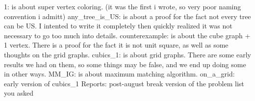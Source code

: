 1:                  is about super vertex coloring. (it was the first i wrote, so very poor naming convention i admitt)
any_tree_is_US:     is about a proof for the fact not every tree can be US. I intented to write it completely then quickly realized it was not necessary to go too much into details.
counterexample:     is about the cube graph + 1 vertex. There is a proof for the fact it is not unit square, as well as some thoughts on the grid graphs.
cubics_1:           is about grid graphs. There are some early results we had on them, so some things may be false, and we end up doing some in other ways.
MM_IG:              is about maximum matching algorithm.
on_a_grid:          early version of cubics_1
Reports:            post-august break version of the problem list you asked